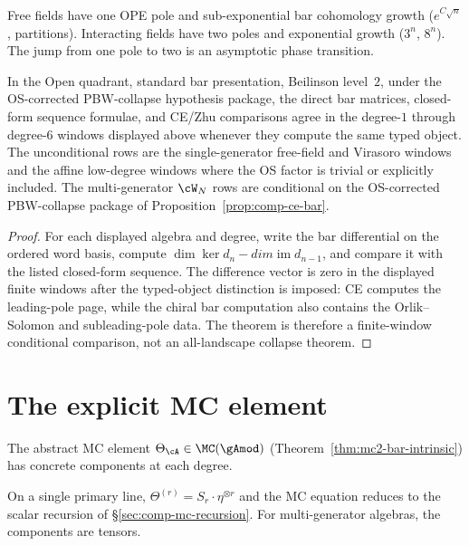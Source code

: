 Free fields have one OPE pole and sub-exponential bar
cohomology growth ($e^{C\sqrt{n}}$, partitions). Interacting
fields have two poles and exponential growth ($3^n$, $8^n$).
The jump from one pole to two is an asymptotic phase transition.

\begin{theorem}
\label{thm:comp-three-way-bar}
\ClaimStatusConditional
In the Open quadrant, standard bar presentation, Beilinson level~$2$,
under the OS-corrected PBW-collapse hypothesis package, the direct bar
matrices, closed-form sequence formulae, and CE/Zhu comparisons agree
in the degree-$1$ through degree-$6$ windows displayed above whenever they compute the same
typed object.  The unconditional rows are the single-generator
free-field and Virasoro windows and the affine low-degree windows
where the OS factor is trivial or explicitly included.  The
multi-generator $\cW_N$ rows are conditional on the OS-corrected
PBW-collapse package of Proposition~\ref{prop:comp-ce-bar}.
\end{theorem}

\begin{proof}
For each displayed algebra and degree, write the bar differential on
the ordered word basis, compute $\dim\ker d_n-dim\operatorname{im}
d_{n-1}$, and compare it with the listed closed-form sequence.  The
difference vector is zero in the displayed finite windows after the
typed-object distinction is imposed: CE
computes the leading-pole page, while the chiral bar computation also
contains the Orlik--Solomon and subleading-pole data.  The theorem is
therefore a finite-window conditional comparison, not an
all-landscape collapse theorem.
\end{proof}


\section{The explicit MC element}
\label{sec:comp-explicit-theta}

The abstract MC element
$\Theta_\cA \in \MC(\gAmod)$
(Theorem~\ref{thm:mc2-bar-intrinsic}) has concrete
components at each degree.

On a single primary line, $\Theta^{(r)} = S_r \cdot \eta^{\otimes r}$
and the MC equation reduces to the scalar recursion of
\S\ref{sec:comp-mc-recursion}. For multi-generator algebras,
the components are tensors.


